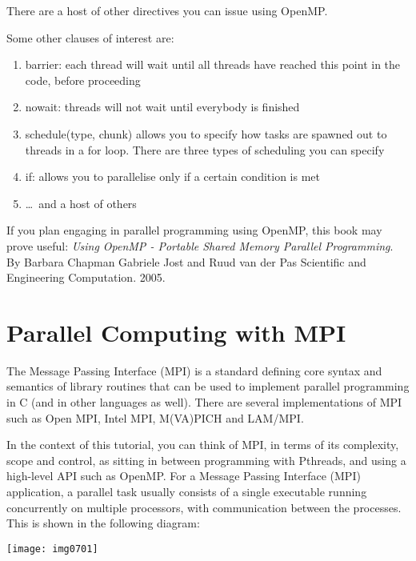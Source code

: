 There are a host of other directives you can issue using OpenMP.

Some other clauses of interest are:

\begin{enumerate}
\item  barrier: each thread will wait until all threads have reached this point in the code, before proceeding
\item  nowait: threads will not wait until everybody is finished
\item  schedule(type, chunk) allows you to specify how tasks are spawned out to threads in a for loop. There are three types of scheduling you can specify
\item  if: allows you to parallelise only if a certain condition is met
\item  \dots\  and a host of others
\end{enumerate}

\begin{tip}
If you plan engaging in parallel programming using OpenMP, this
book may prove useful: \textit{Using OpenMP - Portable Shared Memory Parallel
Programming}. By Barbara Chapman Gabriele Jost and Ruud van der Pas Scientific
and Engineering Computation. 2005.
\end{tip}

\section{Parallel Computing with MPI}

The Message Passing Interface (MPI) is a standard defining core syntax and
semantics of library routines that can be used to implement parallel
programming in C (and in other languages as well). There are several
implementations of MPI such as Open MPI, Intel MPI, M(VA)PICH and LAM/MPI.

In the context of this tutorial, you can think of MPI, in terms of its
complexity, scope and control, as sitting in between programming with Pthreads,
and using a high-level API such as OpenMP. For a Message Passing Interface
(MPI) application, a parallel task usually consists of a single executable
running concurrently on multiple processors, with communication between the
processes.  This is shown in the following diagram:

\begin{center}
\texttt{[image: img0701]}
\end{center}

